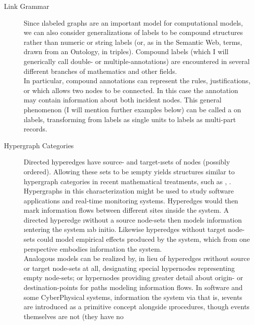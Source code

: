 {\begin{description}
\item[Link Grammar]   Since \i{labeled} 
graphs are an important model for computational models, 
we can also consider generalizations of labels to be 
compound structures rather than numeric or string labels 
(or, as in the Semantic Web,  terms,  
drawn from an Ontology, in  
triples).  Compound labels (which I will generically call 
double- or multiple-annotations) are encountered 
in several different branches of mathematics and other fields.  
\vspace*{.3em}\\\hspace*{3em}
In particular, compound annotations can represent the 
rules, justifications, or  which allows 
two nodes to be connected.   In this case the annotation 
may contain information about both incident nodes.  
This general phenomenon (I will mention further examples 
below) can be called a  
on \i{labels}, transforming from labels as single units 
to labels as multi-part records.
\item[Hypergraph Categories]  Directed hyperedges have source- 
and target-\i{sets} of nodes (possibly ordered).  Allowing 
these sets to be \i{empty} yields structures similar to 
hypergraph categories in recent mathematical treatments, such 
as \cite{BrendanFong}, \cite{AleksKissinger}.  Hypergraphs 
in this characterization might be used to study software applications 
and real-time monitoring systems.  Hyperedges would then 
mark information flows between different sites \i{inside} the 
system.  A directed hyperedge \i{without} a source node-sets then 
models information \i{entering} the system \i{ab initio}.  
Likewise hyperedges without target node-sets could model 
empirical effects produced by the system, which from one 
perspective embodies information  the system.
\vspace*{.3em}\\\hspace*{3em}
Analogous models can be realized by, in lieu of 
hyperedges \i{without} source or target node-sets at all, 
designating special hypernodes representing empty 
node-sets; or hypernodes providing greater detail about 
origin- or destination-points for paths modeling 
information flows.  In software and some CyberPhysical 
systems, information  the system via 
 \mdash{} that is, \i{events} are introduced as a 
primitive concept alongside \i{procedures}, though 
events themselves are not  (they have no 

\end{description}}
